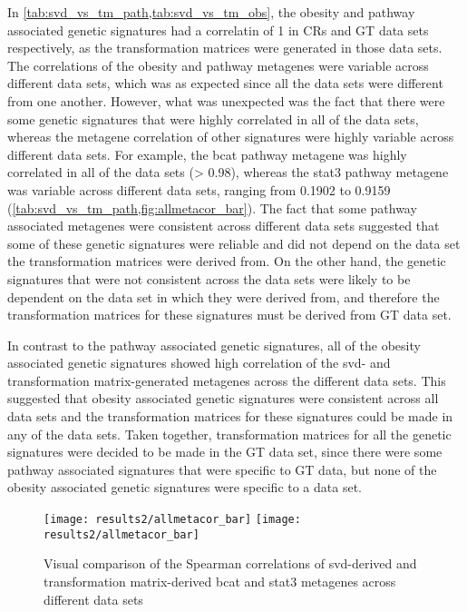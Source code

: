 In \cref{tab:svd_vs_tm_path,tab:svd_vs_tm_obs}, the obesity and pathway associated genetic signatures had a correlatin of 1 in CRs and GT data sets respectively, as the transformation matrices were generated in those data sets.
The correlations of the obesity and pathway metagenes were variable across different data sets, which was as expected since all the data sets were different from one another.
However, what was unexpected was the fact that there were some genetic signatures that were highly correlated in all of the data sets, whereas the metagene correlation of other signatures were highly variable across different data sets.
For example, the \gls{bcat} pathway metagene was highly correlated in all of the data sets (\textgreater{} 0.98), whereas the \gls{stat3} pathway metagene was variable across different data sets, ranging from 0.1902 to 0.9159 (\cref{tab:svd_vs_tm_path,fig:allmetacor_bar}).
The fact that some pathway associated metagenes were consistent across different data sets suggested that some of these genetic signatures were reliable and did not depend on the data set the transformation matrices were derived from.
On the other hand, the genetic signatures that were not consistent across the data sets were likely to be dependent on the data set in which they were derived from, and therefore the transformation matrices for these signatures must be derived from GT data set.

In contrast to the pathway associated genetic signatures, all of the obesity associated genetic signatures showed high correlation of the \gls{svd}- and transformation matrix-generated metagenes across the different data sets.
This suggested that obesity associated genetic signatures were consistent across all data sets and the transformation matrices for these signatures could be made in any of the data sets.
Taken together, transformation matrices for all the genetic  signatures were decided to be made in the GT data set, since there were some pathway associated signatures that were specific to GT data, but none of the obesity associated genetic signatures were specific to a data set.
\\

\begin{figure}[htpb]
	\centering
	\texttt{[image: results2/allmetacor\_bar]}
	\texttt{[image: results2/allmetacor\_bar]}
	\caption{Visual comparison of the Spearman correlations of \gls{svd}-derived and transformation matrix-derived \gls{bcat} and \gls{stat3} metagenes across different data sets}
	\label{fig:allmetacor_bar}
\end{figure}

